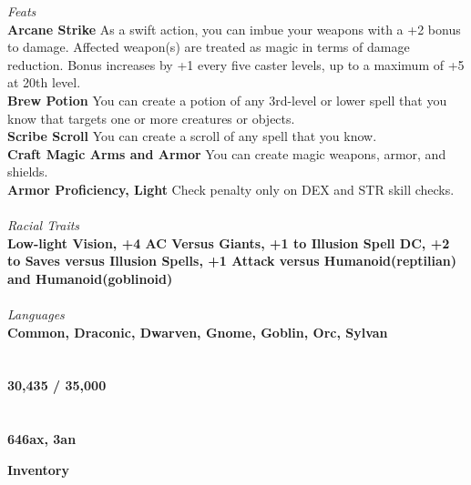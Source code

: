\documentclass[letterpaper]{article}
\begin{document}
\noindent\emph{Feats} \\
\noindent\textbf{Arcane Strike} As a swift action, you can imbue your weapons with a +2 bonus to damage.  Affected weapon(s) are treated as magic in terms of damage reduction.  Bonus increases by +1 every five caster levels, up to a maximum of +5 at 20th level. \\
\noindent\textbf{Brew Potion} You can create a potion of any 3rd-level or lower spell that you know that targets one or more creatures or objects. \\
\noindent\textbf{Scribe Scroll} You can create a scroll of any spell that you know. \\
\noindent\textbf{Craft Magic Arms and Armor} You can create magic weapons, armor, and shields. \\
\noindent\textbf{Armor Proficiency, Light} Check penalty only on {\footnotesize DEX} and {\footnotesize STR} skill checks. \\
\\
\noindent\emph{Racial Traits} \\
\textbf{Low-light Vision, +4 AC Versus Giants, +1 to Illusion Spell DC, +2 to Saves versus Illusion Spells, +1 Attack versus Humanoid(reptilian) and Humanoid(goblinoid)} \\
\\
\noindent\emph{Languages} \\
\textbf{Common, Draconic, Dwarven, Gnome, Goblin, Orc, Sylvan} \\
\\
 \\
\textbf{30,435 / 35,000} \\
\\
 \\
\textbf{646ax, 3an} \\

\pagebreak

\noindent \textbf{\huge{Inventory}} \\
\end{document}
